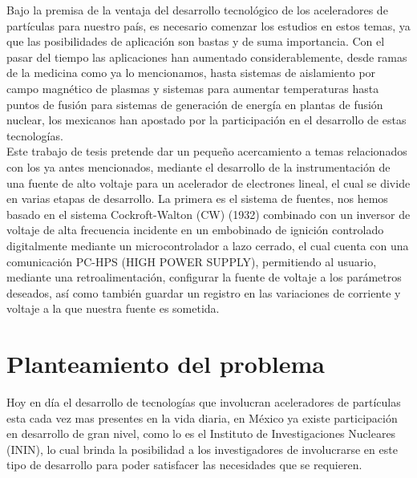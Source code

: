 Bajo la premisa de la ventaja del desarrollo tecnológico de los aceleradores de partículas para nuestro país, es necesario comenzar los estudios en estos temas, ya que las posibilidades de aplicación son bastas y de suma importancia. Con el pasar del tiempo las aplicaciones han aumentado considerablemente, desde ramas de la medicina como ya lo mencionamos, hasta sistemas de aislamiento por campo magnético de plasmas y sistemas para aumentar temperaturas hasta puntos de fusión para sistemas de generación de energía en plantas de fusión nuclear, los mexicanos han apostado por la participación en el desarrollo de estas tecnologías.\\

Este trabajo de tesis pretende dar un pequeño acercamiento a temas relacionados con los ya antes mencionados, mediante el desarrollo de la instrumentación de una fuente de alto voltaje para un acelerador de electrones lineal, el cual se divide en varias etapas de desarrollo. La primera es el sistema de fuentes, nos hemos basado en el sistema Cockroft-Walton (CW) (1932) combinado con un inversor de voltaje de alta frecuencia incidente en un embobinado de ignición controlado digitalmente mediante un microcontrolador a lazo cerrado, el cual cuenta con una comunicación PC-HPS (HIGH POWER SUPPLY), permitiendo al usuario, mediante una retroalimentación, configurar la fuente de voltaje a los parámetros deseados, así como también guardar un registro en las variaciones de corriente y voltaje a la que nuestra fuente es sometida. \\
\newpage



\section{Planteamiento del problema}
Hoy en día el desarrollo de tecnologías que involucran aceleradores de partículas esta cada vez mas presentes en la vida diaria, en México ya existe participación en desarrollo de gran nivel, como lo es el Instituto de Investigaciones Nucleares (ININ), lo cual brinda la posibilidad a los investigadores de involucrarse en este tipo de desarrollo para poder satisfacer las necesidades
que se requieren.\\

